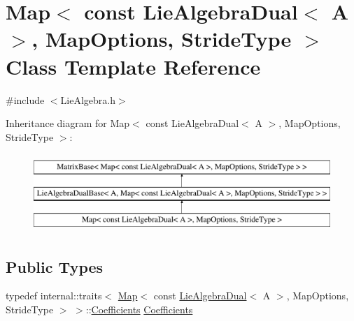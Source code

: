 \hypertarget{class_map_3_01const_01_lie_algebra_dual_3_01_a_01_4_00_01_map_options_00_01_stride_type_01_4}{}\section{Map$<$ const Lie\+Algebra\+Dual$<$ A $>$, Map\+Options, Stride\+Type $>$ Class Template Reference}
\label{class_map_3_01const_01_lie_algebra_dual_3_01_a_01_4_00_01_map_options_00_01_stride_type_01_4}


{\ttfamily \#include $<$Lie\+Algebra.\+h$>$}

Inheritance diagram for Map$<$ const Lie\+Algebra\+Dual$<$ A $>$, Map\+Options, Stride\+Type $>$\+:\begin{figure}[H]
\begin{center}
\leavevmode
\includegraphics[height=3.000000cm]{class_map_3_01const_01_lie_algebra_dual_3_01_a_01_4_00_01_map_options_00_01_stride_type_01_4}
\end{center}
\end{figure}
\subsection*{Public Types}
\begin{DoxyCompactItemize}
\item 
typedef internal\+::traits$<$ \hyperlink{class_map_3_01const_01_lie_algebra_dual_3_01_a_01_4_00_01_map_options_00_01_stride_type_01_4_a3733e2160ea4f13268b2b3e34b33d7c7}{Map}$<$ const \hyperlink{class_lie_algebra_dual}{Lie\+Algebra\+Dual}$<$ A $>$, Map\+Options, Stride\+Type $>$ $>$\+::\hyperlink{class_map_3_01const_01_lie_algebra_dual_3_01_a_01_4_00_01_map_options_00_01_stride_type_01_4_ae2a817b2902e4bf4f79a40724c8c9341}{Coefficients} \hyperlink{class_map_3_01const_01_lie_algebra_dual_3_01_a_01_4_00_01_map_options_00_01_stride_type_01_4_ae2a817b2902e4bf4f79a40724c8c9341}{Coefficients}
\end{DoxyCompactItemize}
